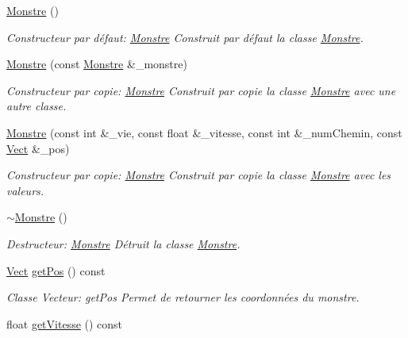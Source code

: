 \begin{DoxyCompactItemize}
\item 
\hyperlink{classMonstre_a8efe47ee8ea4b5ee8e5d3820e620059b}{Monstre} ()
\begin{DoxyCompactList}\small\item\em Constructeur par défaut\+: \hyperlink{classMonstre}{Monstre} Construit par défaut la classe \hyperlink{classMonstre}{Monstre}. \end{DoxyCompactList}\item 
\hyperlink{classMonstre_a9097846a3f136f6db0a51b80a3ccc15d}{Monstre} (const \hyperlink{classMonstre}{Monstre} \&\+\_\+monstre)
\begin{DoxyCompactList}\small\item\em Constructeur par copie\+: \hyperlink{classMonstre}{Monstre} Construit par copie la classe \hyperlink{classMonstre}{Monstre} avec une autre classe. \end{DoxyCompactList}\item 
\hyperlink{classMonstre_aa413ee7bcdcd31bcf5957110c0d31b8a}{Monstre} (const int \&\+\_\+vie, const float \&\+\_\+vitesse, const int \&\+\_\+num\+Chemin, const \hyperlink{classVect}{Vect} \&\+\_\+pos)
\begin{DoxyCompactList}\small\item\em Constructeur par copie\+: \hyperlink{classMonstre}{Monstre} Construit par copie la classe \hyperlink{classMonstre}{Monstre} avec les valeurs. \end{DoxyCompactList}\item 
\mbox{\label{classMonstre_a8e736b63ae1f561904dad7767448156e}} 
\hyperlink{classMonstre_a8e736b63ae1f561904dad7767448156e}{$\sim$\+Monstre} ()
\begin{DoxyCompactList}\small\item\em Destructeur\+: \hyperlink{classMonstre}{Monstre} Détruit la classe \hyperlink{classMonstre}{Monstre}. \end{DoxyCompactList}\item 
\hyperlink{classVect}{Vect} \hyperlink{classMonstre_adbe0edd5d97aef18fb44ef163f368be6}{get\+Pos} () const
\begin{DoxyCompactList}\small\item\em Classe Vecteur\+: get\+Pos Permet de retourner les coordonnées du monstre. \end{DoxyCompactList}\item 
float \hyperlink{classMonstre_a8f94de3aed809fd81f283afce7c3feba}{get\+Vitesse} () const

\end{DoxyCompactItemize}
